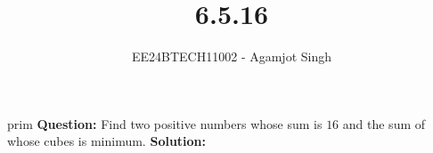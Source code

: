 \documentclass[journal]{IEEEtran}
\begin{document}

\vspace{3cm}

\title{6.5.16}
\author{EE24BTECH11002 - Agamjot Singh}
{\let\newpage\relax\maketitle}

\renewcommand{\thefigure}{\theenumi}
\renewcommand{\thetable}{\theenumi}
\setlength{\intextsep}{10pt} %
prim
\textbf{Question:}
\newline
Find two positive numbers whose sum is $16$ and the sum of whose cubes is minimum.
\textbf{Solution:}
\end{document}
